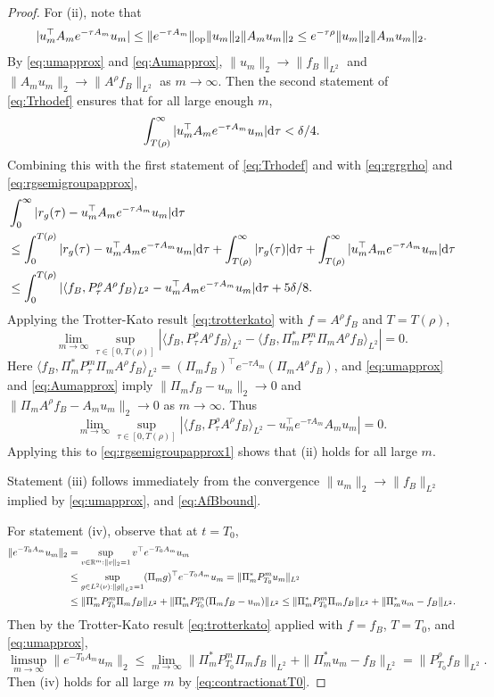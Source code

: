 \begin{proof}
For (ii), note that 
\[|u_m^\top A_me^{-\tau A_m}u_m|
\leq \|e^{-\tau A_m}\|_{\mathrm{op}} \|u_m\|_2 \|A_mu_m\|_2
\leq e^{-\tau\rho}\|u_m\|_2 \|A_mu_m\|_2.\]
By \eqref{eq:umapprox} and \eqref{eq:Aumapprox}, $\|u_m\|_2 \to \|f_B\|_{L^2}$
and $\|A_mu_m\|_2 \to \|A^\rho f_B\|_{L^2}$ as $m \to \infty$. Then the second
statement of \eqref{eq:Trhodef} ensures that for all large enough $m$,
\[\int_{T(\rho)}^\infty
|u_m^\top A_me^{-\tau A_m}u_m|\mathrm{d}\tau<\delta/4.\]
Combining this with the first statement of
\eqref{eq:Trhodef} and with \eqref{eq:rgrgrho} and
\eqref{eq:rgsemigroupapprox},
\begin{align}
&\int_0^\infty |r_g(\tau)-u_m^\top A_me^{-\tau A_m}u_m|\mathrm{d}\tau\notag\\
&\leq \int_0^{T(\rho)} |r_g(\tau)-u_m^\top A_me^{-\tau A_m}u_m|\mathrm{d}\tau
+\int_{T(\rho)}^\infty |r_g(\tau)|\mathrm{d}\tau
+\int_{T(\rho)}^\infty |u_m^\top A_me^{-\tau A_m}u_m|\mathrm{d}\tau\notag\\
&\leq \int_0^{T(\rho)} |\langle f_B,P_\tau^\rho A^\rho f_B \rangle_{L^2}
-u_m^\top A_me^{- \tau A_m}u_m|\mathrm{d}\tau+5\delta/8.\label{eq:rgsemigroupapprox1}
\end{align}
Applying the Trotter-Kato result \eqref{eq:trotterkato} with $f=A^\rho f_B$   and
$T=T(\rho)$,
\[\lim_{m \to \infty}\sup_{\tau \in [0,T(\rho)]}
|\langle f_B,P_\tau^\rho A^\rho f_B \rangle_{L^2}
-\langle f_B,\Pi_m^* P_\tau^m\Pi_m A^\rho f_B\rangle_{L^2}|=0.\]
Here $\langle f_B,\Pi_m^* P_\tau^m\Pi_m A^\rho f_B\rangle_{L^2}
=(\Pi_m f_B)^\top e^{-\tau A_m}(\Pi_m A^\rho f_B)$, and \eqref{eq:umapprox}
and \eqref{eq:Aumapprox} imply $\|\Pi_m f_B-u_m\|_2 \to 0$
and $\|\Pi_m A^\rho f_B-A_mu_m\|_2 \to 0$ as $m \to \infty$. Thus
\[\lim_{m \to \infty}\sup_{\tau \in [0,T(\rho)]}
|\langle f_B,P_\tau^\rho A^\rho f_B \rangle_{L^2}
-u_m^\top e^{-\tau A_m}A_mu_m|=0.\]
Applying this to \eqref{eq:rgsemigroupapprox1} shows that (ii) holds for all
large $m$.

Statement (iii) follows immediately from the convergence $\|u_m\|_2 \to
\|f_B\|_{L^2}$ implied by \eqref{eq:umapprox}, and \eqref{eq:AfBbound}.

For statement (iv),
observe that at $t=T_0$,
\begin{align*}
\|e^{-T_0A_m}u_m\|_2
&=\sup_{v \in \mathbb{R}^m:\|v\|_2=1} v^\top e^{-T_0A_m}u_m\\
&\leq \sup_{g \in L^2(\nu):\|g\|_{L^2}=1} (\Pi_m g)^\top e^{-T_0A_m} u_m
=\|\Pi_m^*P_{T_0}^m u_m\|_{L^2}\\
&\leq \|\Pi_m^* P_{T_0}^m \Pi_m f_B\|_{L^2}
+\|\Pi_m^* P_{T_0}^m(\Pi_m f_B-u_m)\|_{L^2}
\leq \|\Pi_m^* P_{T_0}^m \Pi_m f_B\|_{L^2}+\|\Pi_m^*u_m-f_B\|_{L^2}.
\end{align*}
Then by the Trotter-Kato result \eqref{eq:trotterkato} applied with $f=f_B$,
$T=T_0$, and \eqref{eq:umapprox},
\[\limsup_{m \to \infty}
\|e^{-T_0A_m}u_m\|_2 \leq 
\lim_{m \to \infty} \|\Pi_m^* P_{T_0}^m \Pi_mf_B\|_{L^2}
+\|\Pi_m^*u_m-f_B\|_{L^2}=\|P_{T_0}^\rho f_B\|_{L^2}.\]
Then (iv) holds for all large $m$ by \eqref{eq:contractionatT0}.


\end{proof}
